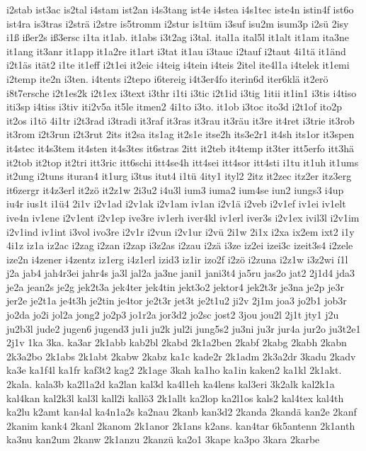{i2stab
ist3ac
is2tal
i4stam
ist2an
i4s3tang
ist4e
i4stea
i4s1tec
iste4n
istin4f
ist6o
ist4ra
is3tras
i2strä
i2stre
is5tromm
i2stur
is1tüm
i3suf
isu2m
isum3p
i2sü
2isy
i1ß
ißer2s
iß3ersc
i1ta
it1ab.
it1abs
i3t2ag
i3tal.
ital1a
ital5l
it1alt
it1am
ita3ne
it1ang
it3anr
it1app
it1a2re
it1art
i3tat
it1au
i3tauc
i2tauf
i2taut
4i1tä
it1änd
i2t1äs
ität2
i1te
it1eff
i2t1ei
it2eic
i4teig
i4tein
i4teis
2itel
ite4l1a
i4telek
it1emi
i2temp
ite2n
i3ten.
i4tents
i2tepo
i6tereig
i4t3er4fo
iterin6d
iter6klä
it2erö
i8t7ersche
i2t1es2k
i2t1ex
i3text
i3thr
i1ti
i3tic
i2t1id
i3tig
1itii
it1in1
i3tis
i4tiso
iti3sp
i4tiss
i3tiv
iti2v5a
it5le
itmen2
4i1to
i3to.
it1ob
i3toc
ito3d
i2t1of
ito2p
it2os
i1tö
4i1tr
i2t3rad
i3tradi
it3raf
it3ras
it3rau
it3räu
it3re
it4ret
i3trie
it3rob
it3rom
i2t3run
i2t3rut
2its
it2sa
its1ag
it2s1e
itse2h
its3e2r1
it4sh
its1or
it3spen
it4stec
it4s3tem
it4sten
it4s3tes
it6stras
2itt
it2teb
it4temp
it3ter
itt5erfo
itt3hä
it2tob
it2top
it2tri
itt3ric
itt6schi
itt4se4h
itt4sei
itt4sor
itt4sti
i1tu
it1uh
it1ums
it2ung
i2tuns
ituran4
it1urg
i3tus
itut4
i1tü
4ity1
ityl2
2itz
it2zec
itz2er
itz3erg
it6zergr
it4z3erl
it2zö
it2z1w
2i3u2
i4u3l
ium3
iuma2
ium4se
iun2
iungs3
i4up
iu4r
ius1t
i1ü4
2i1v
i2v1ad
i2v1ak
i2v1am
iv1an
i2v1ä
i2veb
i2v1ef
iv1ei
iv1elt
ive4n
iv1ene
i2v1ent
i2v1ep
ive3re
iv1erh
iver4kl
iv1erl
iver3s
i2v1ex
ivil3l
i2v1im
i2v1ind
iv1int
i3vol
ivo3re
i2v1r
i2vun
i2v1ur
i2vü
2i1w
2i1x
i2xa
ix2em
ixt2
i1y
4i1z
iz1a
iz2ac
i2zag
i2zan
i2zap
i3z2as
i2zau
i2zä
i3ze
iz2ei
izei3c
izeit3s4
i2zele
ize2n
i4zener
i4zentz
iz1erg
i4z1erl
izid3
iz1ir
izo2f
i2zö
i2zuna
i2z1w
i3z2wi
í1l
j2a
jab4
jah4r3ei
jahr4s
ja3l
jal2a
ja3ne
jani1
jani3t4
ja5ru
jas2o
jat2
2j1d4
jda3
je2a
jean2s
je2g
jek2t3a
jek4ter
jek4tin
jekt3o2
jektor4
jek2t3r
je3na
je2p
je3r
jer2e
je2t1a
je4t3h
je2tin
je4tor
je2t3r
jet3t
je2t1u2
ji2v
2j1m
joa3
jo2b1
job3r
jo2da
jo2i
jol2a
jong2
jo2p3
jo1r2a
jor3d2
jo2sc
jost2
3jou
jou2l
2j1t
jty1
j2u
ju2b3l
jude2
jugen6
jugend3
ju1i
ju2k
jul2i
jung5s2
ju3ni
ju3r
jur4a
jur2o
ju3t2e1
2j1v
1ka
3ka.
ka3ar
2k1abb
kab2bl
2kabd
2k1a2ben
2kabf
2kabg
2kabh
2kabn
2k3a2bo
2k1abs
2k1abt
2kabw
2kabz
ka1c
kade2r
2k1adm
2k3a2dr
3kadu
2kadv
ka3e
ka1f4l
ka1fr
kaf3t2
kag2
2k1age
3kah
ka1ho
ka1in
kaken2
ka1kl
2k1akt.
2kala.
kala3b
ka2l1a2d
ka2lan
kal3d
ka4l1eh
ka4lens
kal3eri
3k2alk
kal2k1a
kal4kan
kal2k3l
kal3l
kall2i
kallö3
2k1allt
ka2lop
ka2l1os
kals2
kal4tex
kal4th
ka2lu
k2amt
kan4al
ka4n1a2s
ka2nau
2kanb
kan3d2
2kanda
2kandä
kan2e
2kanf
2kanim
kank4
2kanl
2kanom
2k1anor
2k1ans
k2ans.
kan4tar
6k5antenn
2k1anth
ka3nu
kan2um
2kanw
2k1anzu
2kanzü
ka2o1
3kape
ka3po
3kara
2karbe
}
